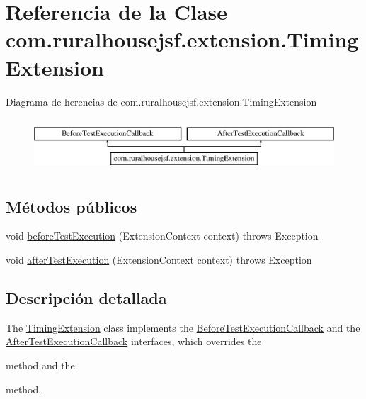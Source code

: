 \hypertarget{classcom_1_1ruralhousejsf_1_1extension_1_1_timing_extension}{}\section{Referencia de la Clase com.\+ruralhousejsf.\+extension.\+Timing\+Extension}
\label{classcom_1_1ruralhousejsf_1_1extension_1_1_timing_extension}
Diagrama de herencias de com.\+ruralhousejsf.\+extension.\+Timing\+Extension\begin{figure}[H]
\begin{center}
\leavevmode
\includegraphics[height=2.000000cm]{classcom_1_1ruralhousejsf_1_1extension_1_1_timing_extension}
\end{center}
\end{figure}
\subsection*{Métodos públicos}
\begin{DoxyCompactItemize}
\item 
void \mbox{\hyperlink{classcom_1_1ruralhousejsf_1_1extension_1_1_timing_extension_ad19d0a2513bd9041f9263c1d9536ed6c}{before\+Test\+Execution}} (Extension\+Context context)  throws Exception 
\item 
void \mbox{\hyperlink{classcom_1_1ruralhousejsf_1_1extension_1_1_timing_extension_a300725ce5f0290e9878185e05d84c019}{after\+Test\+Execution}} (Extension\+Context context)  throws Exception 
\end{DoxyCompactItemize}


\subsection{Descripción detallada}
The \mbox{\hyperlink{classcom_1_1ruralhousejsf_1_1extension_1_1_timing_extension}{Timing\+Extension}} class implements the \mbox{\hyperlink{}{Before\+Test\+Execution\+Callback}} and the \mbox{\hyperlink{}{After\+Test\+Execution\+Callback}} interfaces, which overrides the 
\begin{DoxyCode}{0}
\end{DoxyCode}
 method and the
\begin{DoxyCode}{0}
\end{DoxyCode}
 method. 

